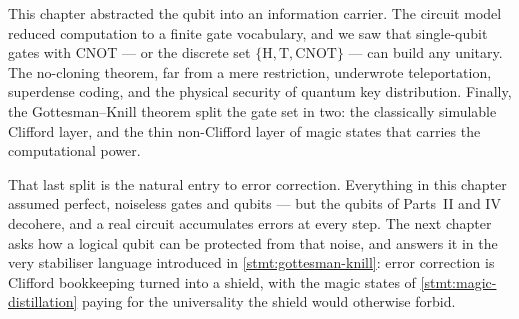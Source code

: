 This chapter abstracted the qubit into an information carrier. The
circuit model reduced computation to a finite gate vocabulary, and we
saw that single-qubit gates with CNOT --- or the discrete set
$\{\mathrm{H},\mathrm{T},\mathrm{CNOT}\}$ --- can build any unitary. The
no-cloning theorem, far from a mere restriction, underwrote
teleportation, superdense coding, and the physical security of quantum
key distribution. Finally, the Gottesman--Knill theorem split the gate
set in two: the classically simulable Clifford layer, and the thin
non-Clifford layer of magic states that carries the computational power.

That last split is the natural entry to error correction. Everything in
this chapter assumed perfect, noiseless gates and qubits --- but the
qubits of Parts~II and IV decohere, and a real circuit accumulates
errors at every step. The next chapter asks how a logical qubit can be
protected from that noise, and answers it in the very stabiliser
language introduced in \cref{stmt:gottesman-knill}: error correction is
Clifford bookkeeping turned into a shield, with the magic states of
\cref{stmt:magic-distillation} paying for the universality the shield
would otherwise forbid.

